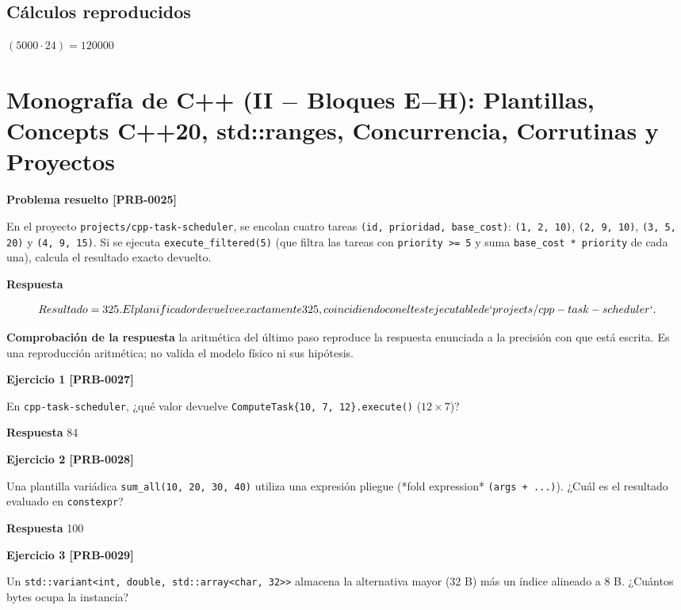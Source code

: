 \documentclass{book}
\begin{document}
\subsection*{Cálculos reproducidos}

\(\left(5000\cdot 24\right) = 120000\)

\section{Monografía de C++ (II \(-\) Bloques E\(-\)H): Plantillas, Concepts C++20, std::ranges, Concurrencia, Corrutinas y Proyectos}

\noindent\textbf{Problema resuelto [PRB-0025]}

En el proyecto \texttt{projects/cpp-task-scheduler}, se encolan cuatro tareas \texttt{(id, prioridad, base\_cost)}: \texttt{(1, 2, 10)}, \texttt{(2, 9, 10)}, \texttt{(3, 5, 20)} y \texttt{(4, 9, 15)}. Si se ejecuta \texttt{execute\_filtered(5)} (que filtra las tareas con \texttt{priority >= 5} y suma \texttt{base\_cost * priority} de cada una), calcula el resultado exacto devuelto.

\noindent\textbf{Respuesta}

\[
Resultado = 325. El planificador devuelve exactamente 325, coincidiendo con el test ejecutable de `projects/cpp-task-scheduler`.
\]

\noindent\textbf{Comprobación de la respuesta} la aritmética del último paso reproduce la respuesta enunciada a la precisión con que está escrita. Es una reproducción aritmética; no valida el modelo físico ni sus hipótesis.

\noindent\textbf{Ejercicio 1 [PRB-0027]}

En \texttt{cpp-task-scheduler}, ¿qué valor devuelve \texttt{ComputeTask\{10, 7, 12\}.execute()} (\(12 \times 7\))?

\noindent\textbf{Respuesta} 84

\noindent\textbf{Ejercicio 2 [PRB-0028]}

Una plantilla variádica \texttt{sum\_all(10, 20, 30, 40)} utiliza una expresión pliegue (*fold expression* \texttt{(args + ...)}). ¿Cuál es el resultado evaluado en \texttt{constexpr}?

\noindent\textbf{Respuesta} 100

\noindent\textbf{Ejercicio 3 [PRB-0029]}

Un \texttt{std::variant<int, double, std::array<char, 32>>} almacena la alternativa mayor (32 B) más un índice alineado a 8 B. ¿Cuántos bytes ocupa la instancia?
\end{document}
